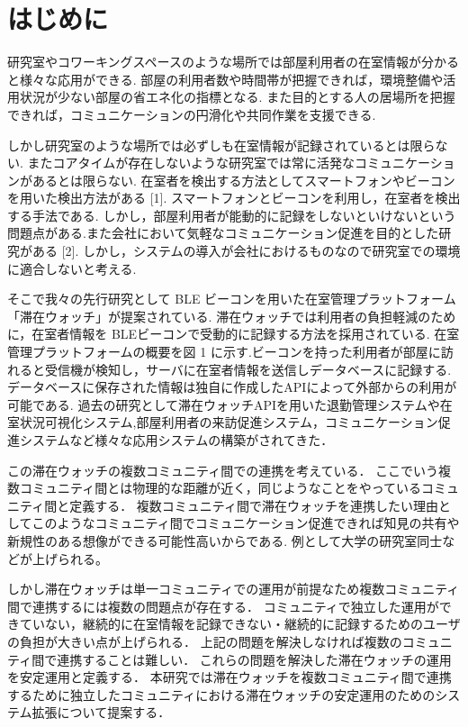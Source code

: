 \thispagestyle{myheadings}

\section{はじめに}
\label{sec:intro}
研究室やコワーキングスペースのような場所では部屋利用者の在室情報が分かると様々な応用ができる.
部屋の利用者数や時間帯が把握できれば，環境整備や活用状況が少ない部屋の省エネ化の指標となる.
また目的とする人の居場所を把握できれば，コミュニケーションの円滑化や共同作業を支援できる.

しかし研究室のような場所では必ずしも在室情報が記録されているとは限らない.
またコアタイムが存在しないような研究室では常に活発なコミュニケーションがあるとは限らない.
在室者を検出する方法としてスマートフォンやビーコンを用いた検出方法がある [1].
スマートフォンとビーコンを利用し，在室者を検出する手法である.
しかし，部屋利用者が能動的に記録をしないといけないという問題点がある.また会社において気軽なコミュニケーション促進を目的とした研究がある [2].
しかし，システムの導入が会社におけるものなので研究室での環境に適合しないと考える.

そこで我々の先行研究として BLE ビーコンを用いた在室管理プラットフォーム「滞在ウォッチ」が提案されている.
滞在ウォッチでは利用者の負担軽減のために，在室者情報を BLEビーコンで受動的に記録する方法を採用されている.
在室管理プラットフォームの概要を図 1 に示す.ビーコンを持った利用者が部屋に訪れると受信機が検知し，サーバに在室者情報を送信しデータベースに記録する.
データベースに保存された情報は独自に作成したAPIによって外部からの利用が可能である.
過去の研究として滞在ウォッチAPIを用いた退勤管理システムや在室状況可視化システム,部屋利用者の来訪促進システム，コミュニケーション促進システムなど様々な応用システムの構築がされてきた．

この滞在ウォッチの複数コミュニティ間での連携を考えている．
ここでいう複数コミュニティ間とは物理的な距離が近く，同じようなことをやっているコミュニティ間と定義する．
複数コミュニティ間で滞在ウォッチを連携したい理由としてこのようなコミュニティ間でコミュニケーション促進できれば知見の共有や新規性のある想像ができる可能性高いからである.
例として大学の研究室同士などが上げられる。

しかし滞在ウォッチは単一コミュニティでの運用が前提なため複数コミュニティ間で連携するには複数の問題点が存在する．
コミュニティで独立した運用ができていない，継続的に在室情報を記録できない・継続的に記録するためのユーザの負担が大きい点が上げられる．
上記の問題を解決しなければ複数のコミュニティ間で連携することは難しい．
これらの問題を解決した滞在ウォッチの運用を安定運用と定義する．
本研究では滞在ウォッチを複数コミュニティ間で連携するために独立したコミュニティにおける滞在ウォッチの安定運用のためのシステム拡張について提案する．